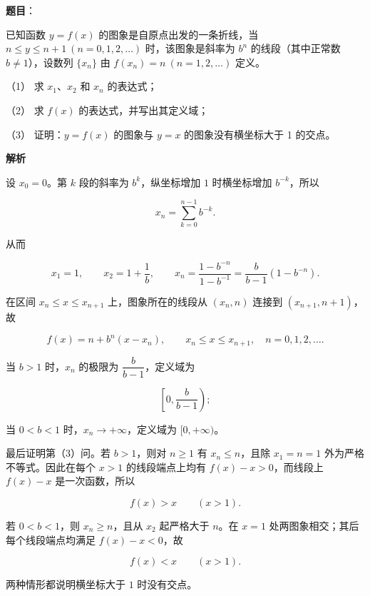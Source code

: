\begin{answer}

\textbf{题目}：

已知函数 $y=f(x)$ 的图象是自原点出发的一条折线，当 $n\le y\le n+1\ (n=0,1,2,\ldots)$ 时，该图象是斜率为 $b^n$ 的线段（其中正常数 $b\ne1$），设数列 $\{x_n\}$ 由 $f(x_n)=n\ (n=1,2,\ldots)$ 定义。

（1） 求 $x_1$、$x_2$ 和 $x_n$ 的表达式；

（2） 求 $f(x)$ 的表达式，并写出其定义域；

（3） 证明：$y=f(x)$ 的图象与 $y=x$ 的图象没有横坐标大于 1 的交点。

\textbf{解析}


设 $x_0=0$。第 $k$ 段的斜率为 $b^k$，纵坐标增加 $1$ 时横坐标增加 $b^{-k}$，所以

\nopagebreak[4]
\[
x_n=\sum_{k=0}^{n-1}b^{-k}.
\]

从而

\nopagebreak[4]
\[
x_1=1,\qquad
x_2=1+\frac1b,
\qquad
x_n=\frac{1-b^{-n}}{1-b^{-1}}
=\frac b{b-1}\left(1-b^{-n}\right).
\]


在区间 $x_n\le x\le x_{n+1}$ 上，图象所在的线段从 $(x_n,n)$ 连接到 $(x_{n+1},n+1)$，故

\nopagebreak[4]
\[
f(x)=n+b^n(x-x_n),
\qquad x_n\le x\le x_{n+1},
\quad n=0,1,2,\ldots.
\]

当 $b>1$ 时，$x_n$ 的极限为 $\dfrac b{b-1}$，定义域为

\nopagebreak[4]
\[
\left[0,\frac b{b-1}\right);
\]

当 $0<b<1$ 时，$x_n\to+\infty$，定义域为 $[0,+\infty)$。


最后证明第（3）问。若 $b>1$，则对 $n\ge1$ 有 $x_n\le n$，且除 $x_1=n=1$ 外为严格不等式。因此在每个 $x>1$ 的线段端点上均有 $f(x)-x>0$，而线段上 $f(x)-x$ 是一次函数，所以

\nopagebreak[4]
\[
f(x)>x\qquad(x>1).
\]

若 $0<b<1$，则 $x_n\ge n$，且从 $x_2$ 起严格大于 $n$。在 $x=1$ 处两图象相交；其后每个线段端点均满足 $f(x)-x<0$，故

\nopagebreak[4]
\[
f(x)<x\qquad(x>1).
\]

两种情形都说明横坐标大于 $1$ 时没有交点。


\gkanswer{答案（2）：$f(x)=n+b^n(x-x_n)$（$x_n\le x\le x_{n+1}$，$n=0,1,2,\ldots$）；$b>1$ 时定义域为 $\left[0,\dfrac b{b-1}\right)$，$0<b<1$ 时定义域为 $[0,+\infty)$。}


\end{answer}
